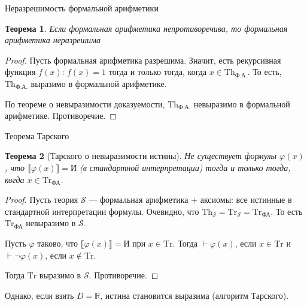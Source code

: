 \documentclass[aspectratio=169]{beamer}
\newtheorem{thm}{Теорема}[section]
\begin{document}
\begin{frame}{Неразрешимость формальной арифметики}
\begin{thm}Если формальная арифметика непротиворечива, то формальная арифметика неразрешима\end{thm}
\begin{proof}
Пусть формальная арифметика разрешима. 
Значит, есть рекурсивная функция $f(x)$: $f(x)=1$ тогда и только тогда, 
когда $x \in \text{Th}_\text{Ф.А.}$. То есть, $\text{Th}_\text{Ф.А.}$ выразимо в формальной арифметике.

По теореме о невыразимости доказуемости, 
$\text{Th}_\text{Ф.А.}$ невыразимо в формальной арифметике. Противоречие.
\end{proof}
\end{frame}

\begin{frame}{Теорема Тарского}
\begin{thm}[Тарского о невыразимости истины]
Не существует формулы $\varphi(x)$, что $\llbracket \varphi(x) \rrbracket = \text{И}$ (в стандартной интерпретации) тогда и только
тогда, когда $x \in \text{Tr}_\text{ФА}$. \end{thm}
\begin{proof}
Пусть теория $\mathcal{S}$ --- формальная арифметика + аксиомы: все истинные в стандартной интерпретации формулы.
Очевидно, что $\text{Th}_\mathcal{S} = \text{Tr}_\mathcal{S} = \text{Tr}_\text{ФА}$. 
То есть $\text{Tr}_\text{ФА}$ невыразимо в $\mathcal{S}$.

Пусть $\varphi$ таково, что $\llbracket\varphi(x)\rrbracket = \text{И}$ при $x \in \text{Tr}$.
Тогда $\vdash\varphi(x)$, если $x \in \text{Tr}$ и $\vdash\neg\varphi(x)$, если $x \notin\text{Tr}$.

Тогда $\text{Tr}$ выразимо в $\mathcal{S}$. Противоречие.
\end{proof}

\pause
Однако, если взять $D = \mathbb{R}$, истина становится выразима (алгоритм Тарского).
\end{frame}
\end{document}
